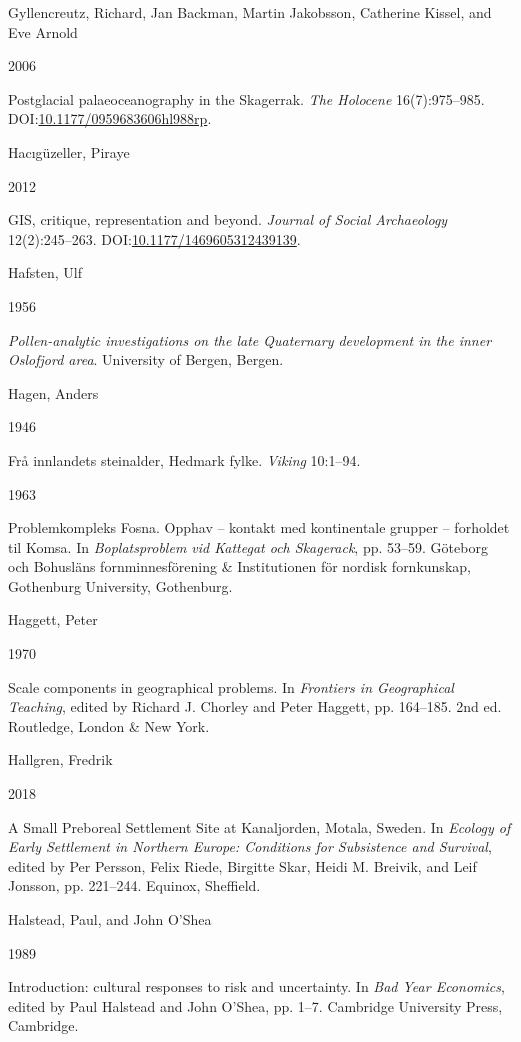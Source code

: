 \documentclass[
  12pt,
  a4paper,
  oneside]{book}
\newlength{\cslhangindent}
\newlength{\csllabelwidth}
\newlength{\cslentryspacingunit} %
\newenvironment{CSLReferences}[2] %
 {%
  \setlength{\parindent}{0pt}
  \ifodd #1
  \let\oldpar\par
  \def\par{\hangindent=\cslhangindent\oldpar}
  \fi
  \setlength{\parskip}{#2\cslentryspacingunit}
 }%
 {}
\newcommand{\CSLBlock}[1]{#1\hfill\break}
\newcommand{\CSLLeftMargin}[1]{\parbox[t]{\csllabelwidth}{#1}}
\newcommand{\CSLRightInline}[1]{\parbox[t]{\linewidth - \csllabelwidth}{#1}\break}
\begin{document}
\begin{CSLReferences}{0}{0}
\leavevmode{}%
\CSLBlock{Gyllencreutz, Richard, Jan Backman, Martin Jakobsson, Catherine Kissel, and Eve Arnold}
\CSLLeftMargin{ 2006}
\CSLRightInline{{Postglacial palaeoceanography in the Skagerrak}. \emph{The Holocene} 16(7):975--985. DOI:\href{https://doi.org/10.1177/0959683606hl988rp}{10.1177/0959683606hl988rp}.}

\leavevmode{}%
\CSLBlock{Hacıgüzeller, Piraye}
\CSLLeftMargin{ 2012}
\CSLRightInline{GIS, critique, representation and beyond. \emph{Journal of Social Archaeology} 12(2):245--263. DOI:\href{https://doi.org/10.1177/1469605312439139}{10.1177/1469605312439139}.}

\leavevmode{}%
\CSLBlock{Hafsten, Ulf}
\CSLLeftMargin{ 1956}
\CSLRightInline{\emph{{Pollen-analytic investigations on the late Quaternary development in the inner Oslofjord area}}. University of Bergen, Bergen.}

\leavevmode{}%
\CSLBlock{Hagen, Anders}
\CSLLeftMargin{ 1946}
\CSLRightInline{{Frå innlandets steinalder, Hedmark fylke}. \emph{Viking} 10:1--94.}

\leavevmode{}%
\CSLLeftMargin{ 1963 }
\CSLRightInline{{Problemkompleks Fosna. Opphav -- kontakt med kontinentale grupper -- forholdet til Komsa}. In \emph{{Boplatsproblem vid Kattegat och Skagerack}}, pp. 53--59. Göteborg och Bohusläns fornminnesförening \& Institutionen för nordisk fornkunskap, Gothenburg University, Gothenburg.}

\leavevmode{}%
\CSLBlock{Haggett, Peter}
\CSLLeftMargin{ 1970}
\CSLRightInline{Scale components in geographical problems. In \emph{{Frontiers in Geographical Teaching}}, edited by Richard J. Chorley and Peter Haggett, pp. 164--185. 2nd ed. Routledge, London \& New York.}

\leavevmode{}%
\CSLBlock{Hallgren, Fredrik}
\CSLLeftMargin{ 2018}
\CSLRightInline{{A Small Preboreal Settlement Site at Kanaljorden, Motala, Sweden}. In \emph{{Ecology of Early Settlement in Northern Europe: Conditions for Subsistence and Survival}}, edited by Per Persson, Felix Riede, Birgitte Skar, Heidi M. Breivik, and Leif Jonsson, pp. 221--244. Equinox, Sheffield.}

\leavevmode{}%
\CSLBlock{Halstead, Paul, and John O'Shea}
\CSLLeftMargin{ 1989}
\CSLRightInline{{Introduction: cultural responses to risk and uncertainty}. In \emph{{Bad Year Economics}}, edited by Paul Halstead and John O'Shea, pp. 1--7. Cambridge University Press, Cambridge.}


\end{CSLReferences}
\end{document}
